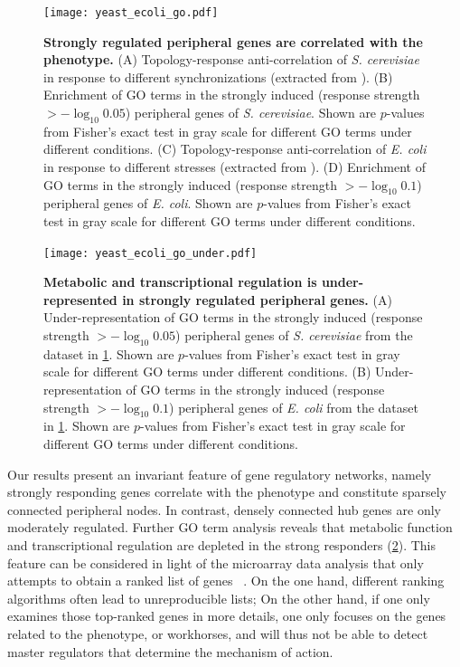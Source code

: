 \begin{figure}[H]
\begin{center}
\texttt{[image: yeast\_ecoli\_go.pdf]}
\end{center}
\caption[GO term enrichment of strongly regulated genes]{
{\bf Strongly regulated peripheral genes are correlated with the phenotype.}
(A) Topology-response
anti-correlation of \emph{S. cerevisiae} in response to different synchronizations
(extracted from \citealp{Spellman1998,Cho1998}). 
(B) Enrichment of GO
terms in the strongly induced (response strength $> -\log_{10}0.05$) 
peripheral genes of \emph{S. cerevisiae}. Shown 
are $p$-values
from Fisher's exact test in gray scale for different GO terms under different 
conditions.
(C) Topology-response anti-correlation of \emph{E. coli} in response 
to different stresses (extracted from \citealp{Jozefczuk2010}). 
(D) Enrichment of GO terms
in the strongly induced (response strength $> -\log_{10}0.1$) 
peripheral genes of \emph{E. coli}. Shown are $p$-values
from Fisher's exact test in gray scale for different GO terms under different 
conditions. 
}
\label{fig:ecoli_yeast_go}
\end{figure}


\begin{figure}[!ht]
\begin{center}
\texttt{[image: yeast\_ecoli\_go\_under.pdf]}
\end{center}
\caption[GO term depletion of strongly regulated genes]{
{\bf Metabolic and transcriptional regulation is under-represented in 
strongly regulated peripheral genes.}
(A) Under-representation of GO
terms in the strongly induced (response strength $> -\log_{10}0.05$) 
peripheral genes of \emph{S. cerevisiae} from
the dataset in \ref{fig:ecoli_yeast_go}. Shown 
are $p$-values
from Fisher's exact test in gray scale for different GO terms under different 
conditions.
(B) Under-representation of GO terms
in the strongly induced (response strength $> -\log_{10}0.1$) peripheral genes 
of \emph{E. coli} from the dataset 
in \ref{fig:ecoli_yeast_go}. Shown are $p$-values
from Fisher's exact test in gray scale for different GO terms under different 
conditions. 
}
\label{fig:ecoli_yeast_go_under}
\end{figure}

Our results present an invariant feature of gene regulatory
networks, namely strongly responding genes correlate with
the phenotype and constitute sparsely connected peripheral nodes.
In contrast, densely connected hub genes are only moderately
regulated. Further GO term analysis reveals that metabolic
function and transcriptional regulation are depleted in the
strong responders (\ref{fig:ecoli_yeast_go_under}).
This feature can be considered in light of 
the microarray data analysis that only attempts to obtain
a ranked list of genes~%
\citep{Boulesteix2009,Smyth2004}. On the one hand, different ranking
algorithms often lead to unreproducible lists; On the other
hand, if one only examines those top-ranked genes in more
details, one only focuses on the genes related to the phenotype,
or workhorses, and will thus not be able to detect master regulators
that determine the mechanism of action.

